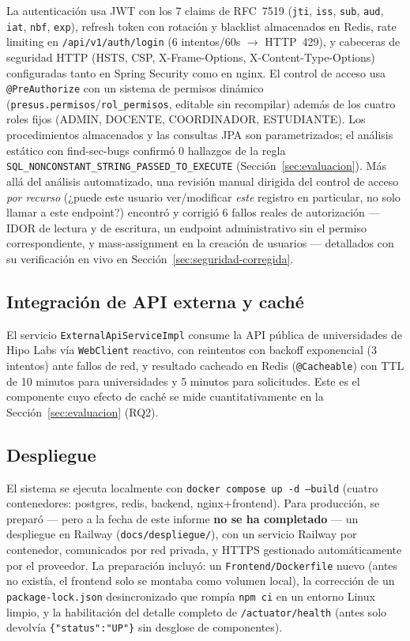 La autenticación usa JWT con los 7 claims de RFC~7519 (\texttt{jti}, \texttt{iss}, \texttt{sub},
\texttt{aud}, \texttt{iat}, \texttt{nbf}, \texttt{exp}), refresh token con rotación y blacklist
almacenados en Redis, rate limiting en \texttt{/api/v1/auth/login} (6 intentos/60s $\rightarrow$
HTTP~429), y cabeceras de seguridad HTTP (HSTS, CSP, X-Frame-Options, X-Content-Type-Options)
configuradas tanto en Spring Security como en nginx. El control de acceso usa
\texttt{@PreAuthorize} con un sistema de permisos dinámico (\texttt{presus.permisos}/\texttt{rol\_permisos},
editable sin recompilar) además de los cuatro roles fijos (ADMIN, DOCENTE, COORDINADOR, ESTUDIANTE). Los
procedimientos almacenados y las consultas JPA son parametrizados; el análisis estático con find-sec-bugs
confirmó 0 hallazgos de la regla \texttt{SQL\_NONCONSTANT\_STRING\_PASSED\_TO\_EXECUTE}
(Sección~\ref{sec:evaluacion}). Más allá del análisis automatizado, una revisión manual dirigida del
control de acceso \emph{por recurso} (¿puede este usuario ver/modificar \emph{este} registro en
particular, no solo llamar a este endpoint?) encontró y corrigió 6 fallos reales de autorización --- IDOR
de lectura y de escritura, un endpoint administrativo sin el permiso correspondiente, y mass-assignment
en la creación de usuarios --- detallados con su verificación en vivo en
Sección~\ref{sec:seguridad-corregida}.

\subsection{Integración de API externa y caché}

El servicio \texttt{ExternalApiServiceImpl} consume la API pública de universidades de Hipo Labs vía
\texttt{WebClient} reactivo, con reintentos con backoff exponencial (3 intentos) ante fallos de red, y
resultado cacheado en Redis (\texttt{@Cacheable}) con TTL de 10 minutos para universidades y 5 minutos
para solicitudes. Este es el componente cuyo efecto de caché se mide cuantitativamente en la
Sección~\ref{sec:evaluacion} (RQ2).

\subsection{Despliegue}

El sistema se ejecuta localmente con \texttt{docker compose up -d --build} (cuatro contenedores:
postgres, redis, backend, nginx+frontend). Para producción, se preparó --- pero a la fecha de este
informe \textbf{no se ha completado} --- un despliegue en Railway (\texttt{docs/despliegue/}), con un
servicio Railway por contenedor, comunicados por red privada, y HTTPS gestionado automáticamente por el
proveedor. La preparación incluyó: un \texttt{Frontend/Dockerfile} nuevo (antes no existía, el frontend
solo se montaba como volumen local), la corrección de un \texttt{package-lock.json} desincronizado que
rompía \texttt{npm ci} en un entorno Linux limpio, y la habilitación del detalle completo de
\texttt{/actuator/health} (antes solo devolvía \texttt{\{"status":"UP"\}} sin desglose de componentes).

